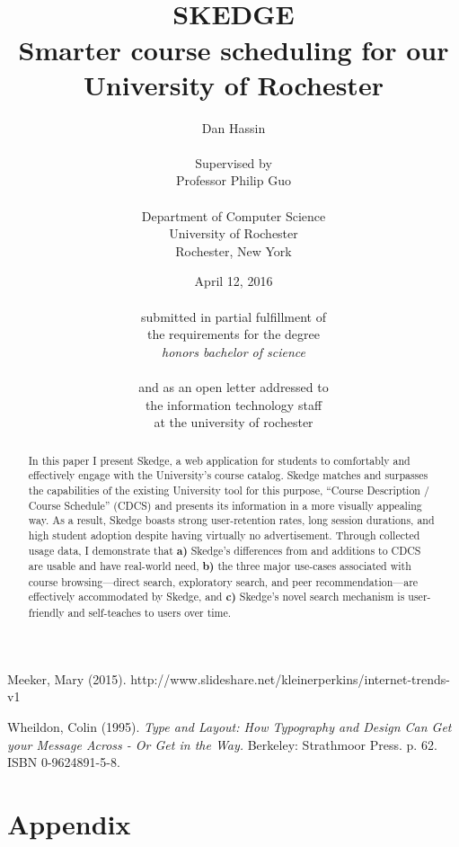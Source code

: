 \documentclass[titlepage]{report}
\title{
\vspace{50pt}\\
\huge \bfseries SKEDGE
\\
\vspace{10pt}
\Large
Smarter course scheduling for our\\
University of Rochester
}
\author{
	Dan Hassin\\
    \vspace{5pt}\\
    Supervised by\\
    Professor Philip Guo\\
    \vspace{2pt}\\
    Department of Computer Science\\
    University of Rochester\\
    Rochester, New York\\
}
\date{April 12, 2016\\
    \vspace{100pt}\\
    submitted in partial fulfillment of\\
    the requirements for the degree\\
    \emph{honors bachelor of science}\\
    \vspace{30pt}\\
    and as an open letter addressed to\\
    the information technology staff\\
    at the university of rochester
    \vspace{-30pt}
}
\begin{document}
\maketitle


\onehalfspacing

\setcounter{tocdepth}{1}
\tableofcontents

\listoftables

\listoffigures

\clearpage


\doublespacing


\begin{abstract}

\thispagestyle{plain}

In this paper I present Skedge, a web application for students to comfortably and effectively engage with the University's course catalog. Skedge matches and surpasses the capabilities of the existing University tool for this purpose, ``Course Description / Course Schedule'' (CDCS) and presents its information in a more visually appealing way. As a result, Skedge boasts strong user-retention rates, long session durations, and high student adoption despite having virtually no advertisement. Through collected usage data, I demonstrate that \textbf{a)} Skedge's differences from and additions to CDCS are usable and have real-world need, \textbf{b)} the three major use-cases associated with course browsing---direct search, exploratory search, and peer recommendation---are effectively accommodated by Skedge, and \textbf{c)} Skedge's novel search mechanism is user-friendly and self-teaches to users over time.

\end{abstract}




\setlength{\skip\footins}{0.75cm}



\clearpage


\clearpage


\clearpage


\clearpage


\clearpage

\begin{thebibliography}{1}

	 Meeker, Mary (2015). http://www.slideshare.net/kleinerperkins/internet-trends-v1

     Wheildon, Colin (1995). \emph{Type and Layout: How Typography and Design Can Get your Message Across - Or Get in the Way.} Berkeley: Strathmoor Press. p. 62. ISBN 0-9624891-5-8.

\end{thebibliography}


\clearpage
\section*{Appendix}
\end{document}
